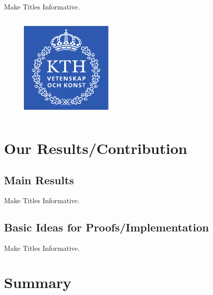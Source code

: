 \documentclass{beamer}
\begin{document}
\begin{frame}{Make Titles Informative.}
\begin{columns}[T]
\begin{minipage}[c][0.35\textheight][c]{0.9\textwidth}
\begin{figure}
          \includegraphics[width=0.4\textwidth]{kth-beamer-resources/logo.pdf}
        \end{figure}
      \end{minipage}
  \end{columns}
\end{frame}

\section{Our Results/Contribution}

\subsection{Main Results}

\begin{frame}{Make Titles Informative.}
\end{frame}

\subsection{Basic Ideas for Proofs/Implementation}

\begin{frame}{Make Titles Informative.}
\end{frame}

\section*{Summary}
\end{document}
